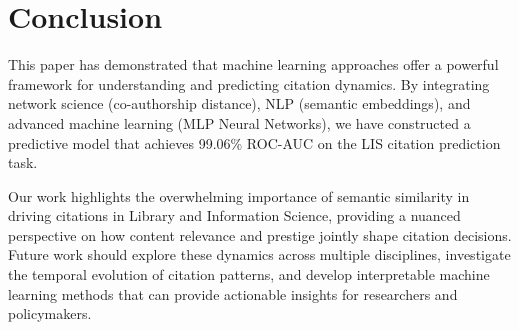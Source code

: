 \documentclass[11pt,a4paper]{article}
\begin{document}
\section{Conclusion}
This paper has demonstrated that machine learning approaches offer a powerful framework for understanding and predicting citation dynamics. By integrating network science (co-authorship distance), NLP (semantic embeddings), and advanced machine learning (MLP Neural Networks), we have constructed a predictive model that achieves 99.06\% ROC-AUC on the LIS citation prediction task.

Our work highlights the overwhelming importance of semantic similarity in driving citations in Library and Information Science, providing a nuanced perspective on how content relevance and prestige jointly shape citation decisions. Future work should explore these dynamics across multiple disciplines, investigate the temporal evolution of citation patterns, and develop interpretable machine learning methods that can provide actionable insights for researchers and policymakers.
\end{document}
